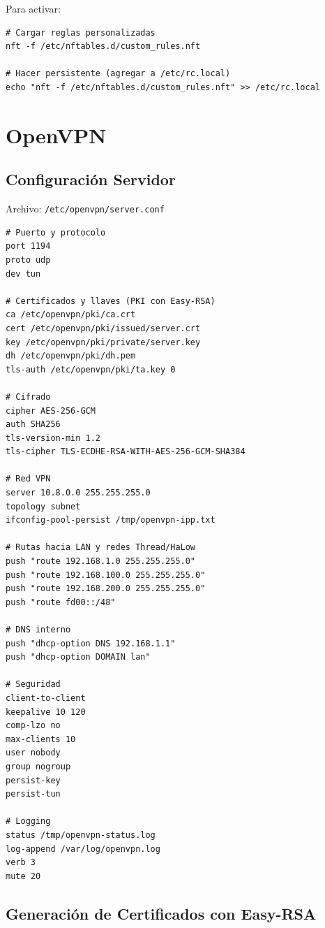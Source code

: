 Para activar:

\begin{verbatim}
# Cargar reglas personalizadas
nft -f /etc/nftables.d/custom_rules.nft

# Hacer persistente (agregar a /etc/rc.local)
echo "nft -f /etc/nftables.d/custom_rules.nft" >> /etc/rc.local
\end{verbatim}

\section{OpenVPN}

\subsection{Configuración Servidor}

Archivo: \texttt{/etc/openvpn/server.conf}

\begin{verbatim}
# Puerto y protocolo
port 1194
proto udp
dev tun

# Certificados y llaves (PKI con Easy-RSA)
ca /etc/openvpn/pki/ca.crt
cert /etc/openvpn/pki/issued/server.crt
key /etc/openvpn/pki/private/server.key
dh /etc/openvpn/pki/dh.pem
tls-auth /etc/openvpn/pki/ta.key 0

# Cifrado
cipher AES-256-GCM
auth SHA256
tls-version-min 1.2
tls-cipher TLS-ECDHE-RSA-WITH-AES-256-GCM-SHA384

# Red VPN
server 10.8.0.0 255.255.255.0
topology subnet
ifconfig-pool-persist /tmp/openvpn-ipp.txt

# Rutas hacia LAN y redes Thread/HaLow
push "route 192.168.1.0 255.255.255.0"
push "route 192.168.100.0 255.255.255.0"
push "route 192.168.200.0 255.255.255.0"
push "route fd00::/48"

# DNS interno
push "dhcp-option DNS 192.168.1.1"
push "dhcp-option DOMAIN lan"

# Seguridad
client-to-client
keepalive 10 120
comp-lzo no
max-clients 10
user nobody
group nogroup
persist-key
persist-tun

# Logging
status /tmp/openvpn-status.log
log-append /var/log/openvpn.log
verb 3
mute 20
\end{verbatim}

\subsection{Generación de Certificados con Easy-RSA}

